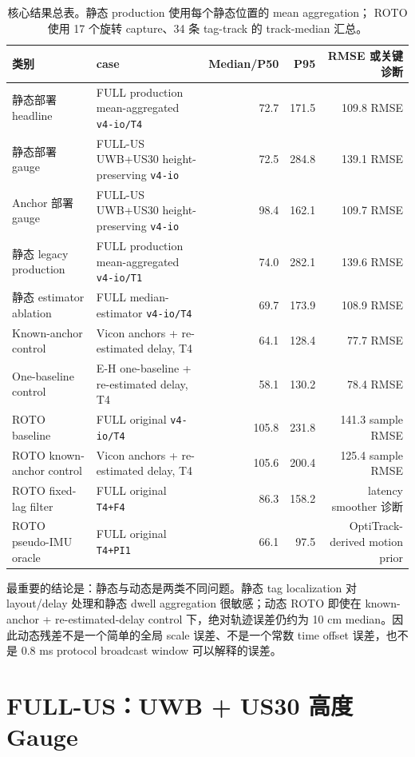 \documentclass[UTF8,11pt,a4paper]{ctexart}
\newcommand{\case}[1]{\texttt{#1}}
\newcommand{\tight}{\setlength{\tabcolsep}{4pt}\renewcommand{\arraystretch}{1.12}}
\begin{document}
\begin{table}[H]
\centering
\tight
\caption{核心结果总表。静态 production 使用每个静态位置的 mean aggregation；
ROTO 使用 17 个旋转 capture、34 条 tag-track 的 track-median 汇总。}
\begin{tabularx}{\textwidth}{lXrrr}
\toprule
类别 & case & Median/P50 & P95 & RMSE 或关键诊断 \\
\midrule
静态部署 headline & FULL production mean-aggregated \case{v4-io/T4} & 72.7 & 171.5 & 109.8 RMSE \\
静态部署 gauge & FULL-US UWB+US30 height-preserving \case{v4-io} & 72.5 & 284.8 & 139.1 RMSE \\
Anchor 部署 gauge & FULL-US UWB+US30 height-preserving \case{v4-io} & 98.4 & 162.1 & 109.7 RMSE \\
静态 legacy production & FULL production mean-aggregated \case{v4-io/T1} & 74.0 & 282.1 & 139.6 RMSE \\
静态 estimator ablation & FULL median-estimator \case{v4-io/T4} & 69.7 & 173.9 & 108.9 RMSE \\
Known-anchor control & Vicon anchors + re-estimated delay, T4 & 64.1 & 128.4 & 77.7 RMSE \\
One-baseline control & E-H one-baseline + re-estimated delay, T4 & 58.1 & 130.2 & 78.4 RMSE \\
ROTO baseline & FULL original \case{v4-io/T4} & 105.8 & 231.8 & 141.3 sample RMSE \\
ROTO known-anchor control & Vicon anchors + re-estimated delay, T4 & 105.6 & 200.4 & 125.4 sample RMSE \\
ROTO fixed-lag filter & FULL original \case{T4+F4} & 86.3 & 158.2 & latency smoother 诊断 \\
ROTO pseudo-IMU oracle & FULL original \case{T4+PI1} & 66.1 & 97.5 & OptiTrack-derived motion prior \\
\bottomrule
\end{tabularx}
\end{table}

最重要的结论是：静态与动态是两类不同问题。静态 tag localization 对 layout/delay
处理和静态 dwell aggregation 很敏感；动态 ROTO 即使在 known-anchor + re-estimated-delay
control 下，绝对轨迹误差仍约为 10 cm median。因此动态残差不是一个简单的全局 scale
误差、不是一个常数 time offset 误差，也不是 0.8 ms protocol broadcast window 可以解释的误差。

\section{FULL-US：UWB + US30 高度 Gauge}
\end{document}
